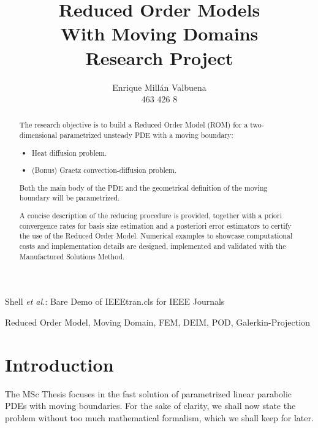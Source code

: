 \documentclass[a4paper, technote, compsoc]{IEEEtran}
\begin{document}
\title{Reduced Order Models \\ With Moving Domains \\ \normalsize{Research Project}}

\author{Enrique Millán Valbuena \\ \normalsize{463 426 8}}%
        
{Shell \MakeLowercase{\textit{et al.}}: Bare Demo of IEEEtran.cls for IEEE Journals}

\maketitle

\begin{abstract}
   The research objective is to build a Reduced Order Model (ROM) for a two-dimensional parametrized unsteady PDE with a moving boundary:
   \begin{itemize}
      \item Heat diffusion problem.
      \item (Bonus) Graetz convection-diffusion problem.
   \end{itemize}
   Both the main body of the PDE and the geometrical definition of the moving boundary will be parametrized.

   A concise description of the reducing procedure is provided, together with a priori convergence rates for basis size estimation and a posteriori error estimators to certify the use of the Reduced Order Model.
   Numerical examples to showcase computational costs and implementation details are designed, implemented and validated with the Manufactured Solutions Method. 
\end{abstract}

\begin{IEEEkeywords}
Reduced Order Model, Moving Domain, FEM, DEIM, POD, Galerkin-Projection
\end{IEEEkeywords}

\section{Introduction}
The MSc Thesis focuses in the fast solution of parametrized linear parabolic PDEs with moving boundaries.
For the sake of clarity, we shall now state the problem without too much mathematical formalism, which we shall keep for later.
\end{document}
